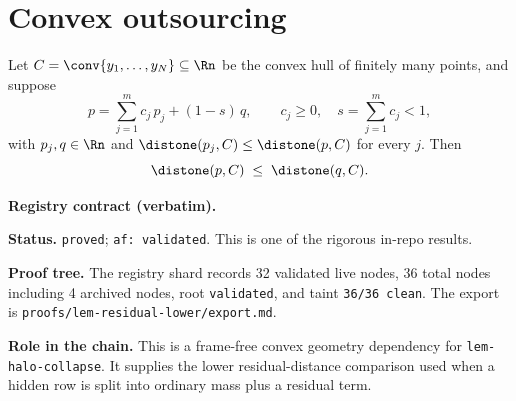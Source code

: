 \section{Convex outsourcing}\label{sec:residual-lower}

\begin{lemma}\label{lem:residual-lower}
Let $C=\conv\{y_1,\dots,y_N\}\subseteq\Rn$ be the convex hull of finitely many
points, and suppose
\[
  p=\sum_{j=1}^m c_j\,p_j+(1-s)\,q,\qquad
  c_j\ge0,\quad s=\sum_{j=1}^m c_j<1,
\]
with $p_j,q\in\Rn$ and $\distone(p_j,C)\le\distone(p,C)$ for every $j$. Then
\[
  \distone(p,C)\;\le\;\distone(q,C).
\]
\end{lemma}

\noindent\textbf{Registry contract (verbatim).}

\noindent\textbf{Status.} \texttt{proved}; \texttt{af: validated}.
This is one of the rigorous in-repo results.

\noindent\textbf{Proof tree.} The registry shard records 32 validated
live nodes, 36 total nodes including 4 archived nodes, root
\texttt{validated}, and taint \texttt{36/36 clean}.  The export is
\texttt{proofs/lem-residual-lower/export.md}.

\noindent\textbf{Role in the chain.} This is a frame-free convex
geometry dependency for \texttt{lem-halo-collapse}.  It supplies the
lower residual-distance comparison used when a hidden row is split into
ordinary mass plus a residual term.
